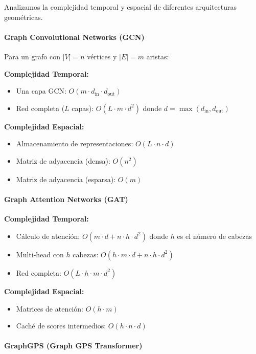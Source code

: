 Analizamos la complejidad temporal y espacial de diferentes arquitecturas geométricas.

\paragraph{Graph Convolutional Networks (GCN)}

Para un grafo con $|V| = n$ vértices y $|E| = m$ aristas:

\textbf{Complejidad Temporal:}
\begin{itemize}
\item Una capa GCN: $O(m \cdot d_{\text{in}} \cdot d_{\text{out}})$
\item Red completa ($L$ capas): $O(L \cdot m \cdot d^2)$ donde $d = \max(d_{\text{in}}, d_{\text{out}})$
\end{itemize}

\textbf{Complejidad Espacial:}
\begin{itemize}
\item Almacenamiento de representaciones: $O(L \cdot n \cdot d)$
\item Matriz de adyacencia (densa): $O(n^2)$
\item Matriz de adyacencia (esparsa): $O(m)$
\end{itemize}

\paragraph{Graph Attention Networks (GAT)}

\textbf{Complejidad Temporal:}
\begin{itemize}
\item Cálculo de atención: $O(m \cdot d + n \cdot h \cdot d^2)$ donde $h$ es el número de cabezas
\item Multi-head con $h$ cabezas: $O(h \cdot m \cdot d + n \cdot h \cdot d^2)$
\item Red completa: $O(L \cdot h \cdot m \cdot d^2)$
\end{itemize}

\textbf{Complejidad Espacial:}
\begin{itemize}
\item Matrices de atención: $O(h \cdot m)$
\item Caché de scores intermedios: $O(h \cdot n \cdot d)$
\end{itemize}

\paragraph{GraphGPS (Graph GPS Transformer)}

